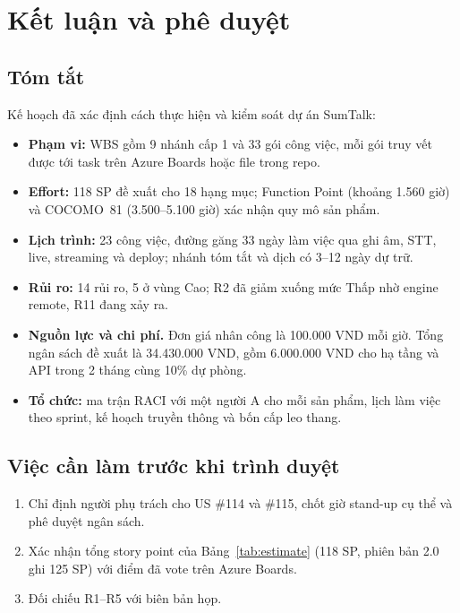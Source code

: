 \documentclass[12pt,a4paper]{report}
\begin{document}
\chapter{Kết luận và phê duyệt}
\label{chap:conclusion}

\section{Tóm tắt}

Kế hoạch đã xác định cách thực hiện và kiểm soát dự án SumTalk:
\begin{itemize}
  \item \textbf{Phạm vi:} WBS gồm 9 nhánh cấp 1 và 33 gói công việc, mỗi gói truy vết được tới task trên Azure
        Boards hoặc file trong repo.
  \item \textbf{Effort:} 118 SP đề xuất cho 18 hạng mục; Function Point (khoảng 1.560 giờ) và COCOMO~81
        (3.500--5.100 giờ) xác nhận quy mô sản phẩm.
  \item \textbf{Lịch trình:} 23 công việc, đường găng 33 ngày làm việc qua ghi âm, STT, live, streaming và deploy;
        nhánh tóm tắt và dịch có 3--12 ngày dự trữ.
  \item \textbf{Rủi ro:} 14 rủi ro, 5 ở vùng Cao; R2 đã giảm xuống mức Thấp nhờ engine remote, R11 đang xảy ra.
  \item \textbf{Nguồn lực và chi phí.} Đơn giá nhân công là 100.000 VND mỗi giờ. Tổng ngân sách đề xuất là
        34.430.000 VND, gồm 6.000.000 VND cho hạ tầng và API trong 2 tháng cùng 10\% dự phòng.
  \item \textbf{Tổ chức:} ma trận RACI với một người A cho mỗi sản phẩm, lịch làm việc theo sprint, kế hoạch truyền thông và
        bốn cấp leo thang.
\end{itemize}

\section{Việc cần làm trước khi trình duyệt}

\begin{enumerate}
  \item Chỉ định người phụ trách cho US \#114 và \#115, chốt giờ stand-up cụ thể và phê duyệt ngân sách.
  \item Xác nhận tổng story point của Bảng~\ref{tab:estimate} (118 SP, phiên bản 2.0 ghi 125 SP) với điểm đã vote
        trên Azure Boards.
  \item Đối chiếu R1--R5 với biên bản họp.
\end{enumerate}
\end{document}
